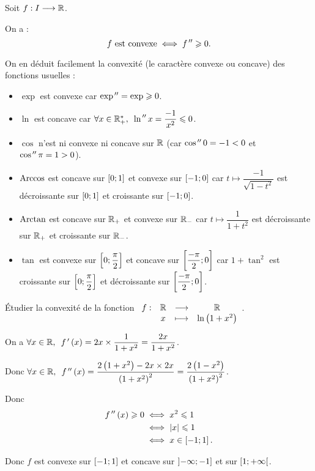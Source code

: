 \begin{cor}
Soit \(f:I\longrightarrow\mathbb{R}\).

On a : \[f\text{ est convexe}\iff f^{\,\prime\prime}\geqslant0.\]
\end{cor}

\begin{ex}
On en déduit facilement la convexité (\ie le caractère convexe ou concave) des fonctions usuelles :

\begin{itemize}
\item \(\exp\) est convexe car \(\exp^{\,\prime\prime}=\exp\geqslant0\).

\item \(\ln\) est concave car \(\quantifs{\forall x\in\Rps}\ln\seconde x=\dfrac{-1}{x^2}\leq0\).

\item \(\cos\) n'est ni convexe ni concave sur \(\mathbb{R}\) (car \(\cos^{\,\prime\prime}0=-1<0\) et \(\cos^{\,\prime\prime}\pi=1>0\)).

\item \(\operatorname{Arccos}\) est concave sur \(\left[0;1\right]\) et convexe sur \(\left[-1;0\right]\) car \(t\mapsto\dfrac{-1}{\sqrt{1-t^2}}\) est décroissante sur \(\left[0;1\right]\) et croissante sur \(\left[-1;0\right]\).

\item \(\operatorname{Arctan}\) est concave sur \(\mathbb{R}_+\) et convexe sur \(\mathbb{R}_-\) car \(t\mapsto\dfrac{1}{1+t^2}\) est décroissante sur \(\mathbb{R}_+\) et croissante sur \(\mathbb{R}_-\).

\item \(\tan\) est convexe sur \(\left[0;\dfrac{\pi}{2}\right]\) et concave sur \(\left[\dfrac{-\pi}{2};0\right]\) car \(1+\tan^2\) est croissante sur \(\left[0;\dfrac{\pi}{2}\right]\) et décroissante sur \(\left[\dfrac{-\pi}{2};0\right]\).
\end{itemize}
\end{ex}

\begin{exo}
Étudier la convexité de la fonction \(\begin{array}[t]{cccc}f : & \mathbb{R} & \longrightarrow & \mathbb{R} \\ & x & \longmapsto & \ln\left(1+x^2\right)\end{array}\).
\end{exo}

\begin{corr}
On a \(\quantifs{\forall x\in\R}f\prim\paren{x}=2x\times\dfrac{1}{1+x^2}=\dfrac{2x}{1+x^2}\).

Donc \(\quantifs{\forall x\in\R}f\seconde\paren{x}=\dfrac{2\paren{1+x^2}-2x\times2x}{\paren{1+x^2}^2}=\dfrac{2\paren{1-x^2}}{\paren{1+x^2}^2}\).

Donc \[\begin{aligned}
f^{\,\prime\prime}\left(x\right)\geqslant0&\iff x^2\leqslant1 \\
&\iff\left\lvert x\right\rvert\leqslant1 \\
&\iff x\in\left[-1;1\right].
\end{aligned}\]

Donc \(f\) est convexe sur \(\left[-1;1\right]\) et concave sur \(\left]-\infty;-1\right]\) et sur \(\left[1;+\infty\right[\).
\end{corr}

